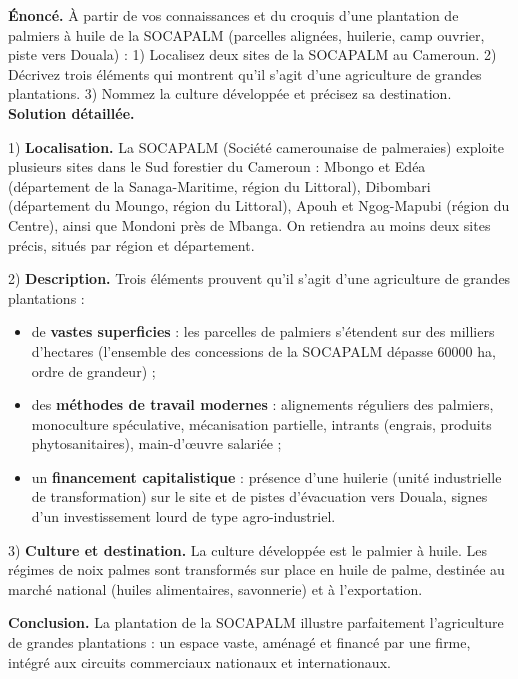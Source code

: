 \documentclass[11pt]{article}
\newcommand{\cle}[1]{{\popxbold\color{popdark}#1}}
\begin{document}
\begin{exoresolu}
\textbf{Énoncé.} À partir de vos connaissances et du croquis d'une plantation de palmiers à huile de la SOCAPALM (parcelles alignées, huilerie, camp ouvrier, piste vers Douala) : 1) Localisez deux sites de la SOCAPALM au Cameroun. 2) Décrivez trois éléments qui montrent qu'il s'agit d'une agriculture de grandes plantations. 3) Nommez la culture développée et précisez sa destination.
\tcblower
\textbf{Solution détaillée.}

1) \textbf{Localisation.} La SOCAPALM (Société camerounaise de palmeraies) exploite plusieurs sites dans le \cle{Sud forestier} du Cameroun : Mbongo et Edéa (département de la Sanaga-Maritime, région du Littoral), Dibombari (département du Moungo, région du Littoral), Apouh et Ngog-Mapubi (région du Centre), ainsi que Mondoni près de Mbanga. On retiendra au moins deux sites précis, situés par région et département.

2) \textbf{Description.} Trois éléments prouvent qu'il s'agit d'une agriculture de grandes plantations :
\begin{itemize}
\item de \textbf{vastes superficies} : les parcelles de palmiers s'étendent sur des milliers d'hectares (l'ensemble des concessions de la SOCAPALM dépasse \num{60000} ha, ordre de grandeur) ;
\item des \textbf{méthodes de travail modernes} : alignements réguliers des palmiers, monoculture spéculative, mécanisation partielle, intrants (engrais, produits phytosanitaires), main-d'œuvre salariée ;
\item un \textbf{financement capitalistique} : présence d'une huilerie (unité industrielle de transformation) sur le site et de pistes d'évacuation vers Douala, signes d'un investissement lourd de type agro-industriel.
\end{itemize}

3) \textbf{Culture et destination.} La culture développée est le \cle{palmier à huile}. Les régimes de noix palmes sont transformés sur place en huile de palme, destinée au marché national (huiles alimentaires, savonnerie) et à l'exportation.

\textbf{Conclusion.} La plantation de la SOCAPALM illustre parfaitement l'agriculture de grandes plantations : un espace vaste, aménagé et financé par une firme, intégré aux circuits commerciaux nationaux et internationaux.
\end{exoresolu}
\end{document}
